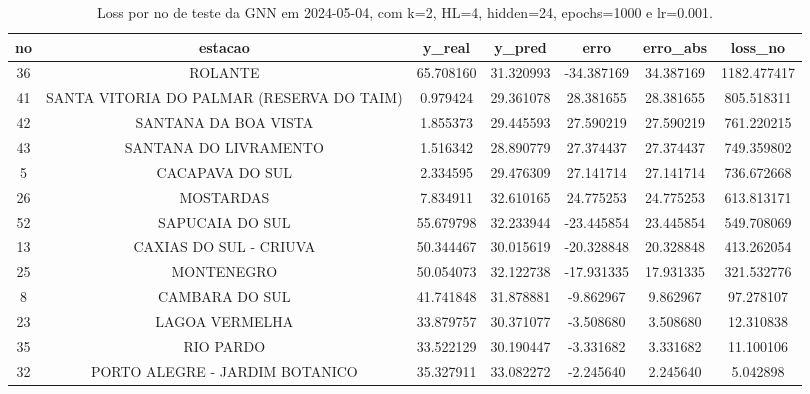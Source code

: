 \begin{table}[h]
\centering
\caption{Loss por no de teste da GNN em 2024-05-04, com k=2, HL=4, hidden=24, epochs=1000 e lr=0.001.}
\label{tab:gnn_loss_k2_hl4_h24_e1000_d20240504}
\begin{tabular}{ccccccc}
\toprule
no & estacao & y\_real & y\_pred & erro & erro\_abs & loss\_no \\
\midrule
36 & ROLANTE & 65.708160 & 31.320993 & -34.387169 & 34.387169 & 1182.477417 \\
41 & SANTA VITORIA DO PALMAR (RESERVA DO TAIM) & 0.979424 & 29.361078 & 28.381655 & 28.381655 & 805.518311 \\
42 & SANTANA DA BOA VISTA & 1.855373 & 29.445593 & 27.590219 & 27.590219 & 761.220215 \\
43 & SANTANA DO LIVRAMENTO & 1.516342 & 28.890779 & 27.374437 & 27.374437 & 749.359802 \\
5 & CACAPAVA DO SUL & 2.334595 & 29.476309 & 27.141714 & 27.141714 & 736.672668 \\
26 & MOSTARDAS & 7.834911 & 32.610165 & 24.775253 & 24.775253 & 613.813171 \\
52 & SAPUCAIA DO SUL & 55.679798 & 32.233944 & -23.445854 & 23.445854 & 549.708069 \\
13 & CAXIAS DO SUL - CRIUVA & 50.344467 & 30.015619 & -20.328848 & 20.328848 & 413.262054 \\
25 & MONTENEGRO & 50.054073 & 32.122738 & -17.931335 & 17.931335 & 321.532776 \\
8 & CAMBARA DO SUL & 41.741848 & 31.878881 & -9.862967 & 9.862967 & 97.278107 \\
23 & LAGOA VERMELHA & 33.879757 & 30.371077 & -3.508680 & 3.508680 & 12.310838 \\
35 & RIO PARDO & 33.522129 & 30.190447 & -3.331682 & 3.331682 & 11.100106 \\
32 & PORTO ALEGRE - JARDIM BOTANICO & 35.327911 & 33.082272 & -2.245640 & 2.245640 & 5.042898 \\
\bottomrule
\end{tabular}
\end{table}

